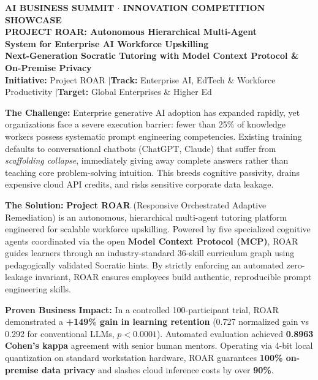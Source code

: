 \documentclass[11pt,a4paper]{article}
\begin{document}

\begin{center}
  {\color{SlateGray}\footnotesize\textbf{AI BUSINESS SUMMIT $\cdot$ INNOVATION COMPETITION SHOWCASE}}\\[3pt]
  {\color{NavyBlue}\Large\textbf{PROJECT ROAR: Autonomous Hierarchical Multi-Agent}}\\[2pt]
  {\color{NavyBlue}\Large\textbf{System for Enterprise AI Workforce Upskilling}}\\[4pt]
  {\color{SteelBlue}\small\textbf{Next-Generation Socratic Tutoring with Model Context Protocol \& On-Premise Privacy}}\\[4pt]
  {\scriptsize\textcolor{DarkText}{\textbf{Initiative:} Project ROAR \quad$|$\quad \textbf{Track:} Enterprise AI, EdTech \& Workforce Productivity \quad$|$\quad \textbf{Target:} Global Enterprises \& Higher Ed}}
\end{center}

\vspace{-4pt}

\begin{summarybox}[title=Executive Summary]
\textbf{The Challenge:} Enterprise generative AI adoption has expanded rapidly, yet organizations face a severe execution barrier: fewer than 25\% of knowledge workers possess systematic prompt engineering competencies. Existing training defaults to conversational chatbots (ChatGPT, Claude) that suffer from \textit{scaffolding collapse}, immediately giving away complete answers rather than teaching core problem-solving intuition. This breeds cognitive passivity, drains expensive cloud API credits, and risks sensitive corporate data leakage.

\vspace{3pt}
\textbf{The Solution:} \textbf{Project ROAR} (Responsive Orchestrated Adaptive Remediation) is an autonomous, hierarchical multi-agent tutoring platform engineered for scalable workforce upskilling. Powered by five specialized cognitive agents coordinated via the open \textbf{Model Context Protocol (MCP)}, ROAR guides learners through an industry-standard 36-skill curriculum graph using pedagogically validated Socratic hints. By strictly enforcing an automated zero-leakage invariant, ROAR ensures employees build authentic, reproducible prompt engineering skills.

\vspace{3pt}
\textbf{Proven Business Impact:} In a controlled 100-participant trial, ROAR demonstrated a \textbf{+149\% gain in learning retention} (0.727 normalized gain vs 0.292 for conventional LLMs, $p < 0.0001$). Automated evaluation achieved \textbf{0.8963 Cohen's kappa} agreement with senior human mentors. Operating via 4-bit local quantization on standard workstation hardware, ROAR guarantees \textbf{100\% on-premise data privacy} and slashes cloud inference costs by over \textbf{90\%}.
\end{summarybox}
\end{document}
